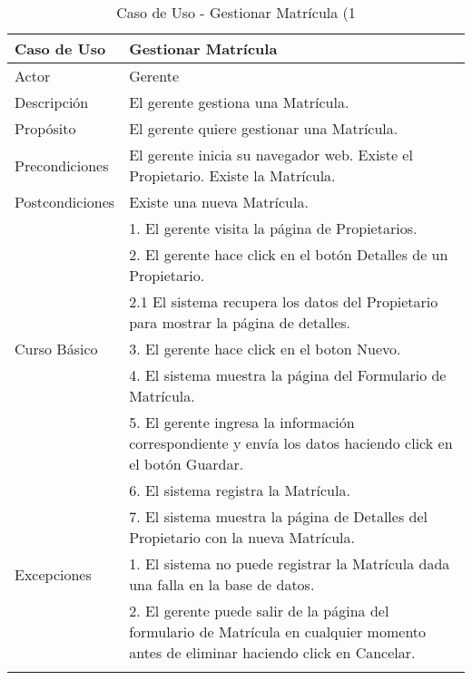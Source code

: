 \begin{longtable}{@{} p{3cm} p{10cm} @{}} \toprule
    \textbf{Caso de Uso}    & Gestionar Matrícula \\ \midrule
    Actor                   & Gerente \\ \cmidrule{1-2}
    Descripción             & El gerente gestiona una Matrícula. \\ \cmidrule{1-2}
    Propósito               & El gerente quiere gestionar una Matrícula. \\ \cmidrule{1-2}
    Precondiciones          & El gerente inicia su navegador web. Existe el Propietario. Existe la Matrícula. \\ \cmidrule{1-2} 
    Postcondiciones         & Existe una nueva Matrícula. \\ \cmidrule{1-2} 
                            & 1. El gerente visita la página de Propietarios. \\ 
                            & 2. El gerente hace click en el botón Detalles de un Propietario. \\
                            & 2.1 El sistema recupera los datos del Propietario para mostrar la página de detalles. \\
    Curso Básico            & 3. El gerente hace click en el boton Nuevo. \\
                            & 4. El sistema muestra la página del Formulario de Matrícula. \\
                            & 5. El gerente ingresa la información correspondiente y envía los datos haciendo click en el botón Guardar. \\ 
                            & 6. El sistema registra la Matrícula. \\ 
                            & 7. El sistema muestra la página de Detalles del Propietario con la nueva Matrícula. \\ \cmidrule{1-2}
    Excepciones             & 1. El sistema no puede registrar la Matrícula dada una falla en la base de datos. \\
                            & 2. El gerente puede salir de la página del formulario de Matrícula en cualquier momento antes de eliminar haciendo click en Cancelar. \\ \bottomrule
   \caption{Caso de Uso - Gestionar Matrícula (1} \label{tab:tabcu-matri1} \\
   \end{longtable}

